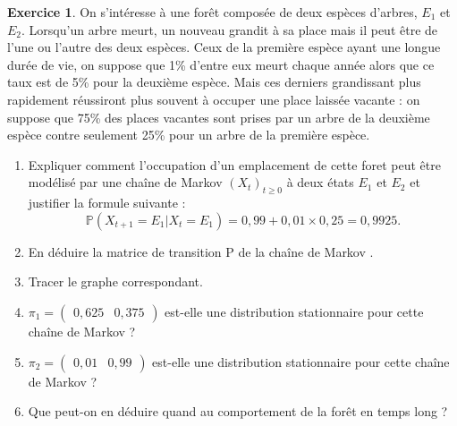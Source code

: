 \documentclass[10pt,fleqn, svgnames]{article}
\theoremstyle{definition}
\newtheorem{exo}{Exercice}
\begin{document}
\begin{exo}
On s’int\'eresse \`a une forêt compos\'ee de deux esp\`eces d’arbres, $E_1$ et $E_2$. Lorsqu’un arbre meurt, un nouveau grandit \`a
sa place mais il peut être de l’une ou l’autre des deux esp\`eces. Ceux de la premi\`ere esp\`ece
ayant une longue dur\'ee de vie, on suppose que 1\% d’entre eux meurt chaque ann\'ee alors
que ce taux est de 5\% pour la deuxi\`eme esp\`ece. Mais ces derniers grandissant plus rapidement r\'eussiront plus souvent \`a occuper une place laiss\'ee vacante : on suppose que 75\%
des places vacantes sont prises par un arbre de la deuxi\`eme esp\`ece contre seulement 25\%
pour un arbre de la premi\`ere esp\`ece.
\begin{enumerate}
\item Expliquer comment l'occupation d'un emplacement de cette foret peut être modélisé par une chaîne
de Markov $(X_t)_{t\geq 0}$ \`a deux \'etats $E_1$ et $E_2$ et justifier la formule suivante :
$$\mathbb P(X_{t+1} = E_1|X_t = E_1)=0, 99 + 0, 01 \times 0, 25 = 0, 9925.$$
\item En d\'eduire la matrice de transition P de la chaîne de Markov .
\item Tracer le graphe correspondant.
\item $\pi_1 = \begin{pmatrix}0, 625 &0, 375\end{pmatrix}$ est-elle une distribution stationnaire pour cette chaîne de Markov ?
\item $\pi_2 = \begin{pmatrix}0, 01 &0, 99\end{pmatrix}$ est-elle une distribution stationnaire pour cette chaîne de Markov ?
\item Que peut-on en déduire quand au comportement de la forêt en temps long ?
\end{enumerate}
\end{exo}
\end{document}
